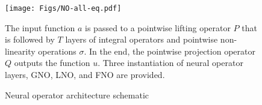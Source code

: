 \begin{figure}[t]
    \centering
    \texttt{[image: Figs/NO-all-eq.pdf]}
    \caption{Neural operator architecture schematic}
    \label{fig:NO_architecture} 
    \small{The input function $a$ is passed to a pointwise lifting operator $P$ that is followed by $T$ layers of integral operators and pointwise non-linearity operations $\sigma$. In the end, the pointwise projection operator $Q$ outputs the function $u$. Three instantiation of neural operator layers, GNO, LNO, and FNO are provided.}
\end{figure}







